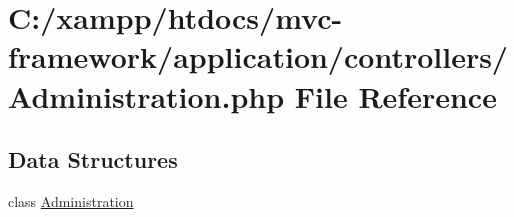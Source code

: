 \hypertarget{controllers_2_administration_8php}{}\section{C\+:/xampp/htdocs/mvc-\/framework/application/controllers/\+Administration.php File Reference}
\label{controllers_2_administration_8php}
\subsection*{Data Structures}
\begin{DoxyCompactItemize}
\item 
class \hyperlink{class_administration}{Administration}
\end{DoxyCompactItemize}
